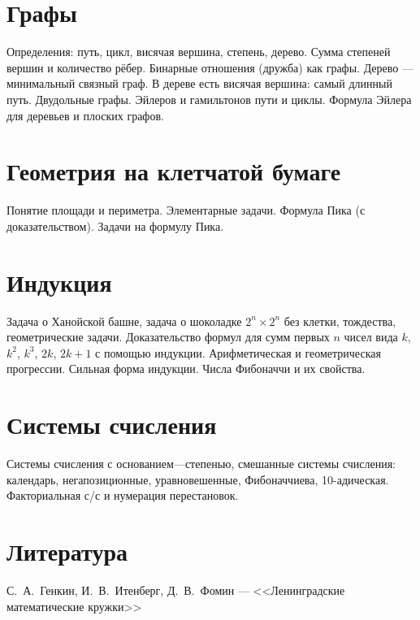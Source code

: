 \documentclass[a4paper,11pt,landscape]{article}
\begin{document}
\begin{paracol}{2}

\setlength{\columnsep}{0.9cm}

\setcounter{section}{11}

\section{Графы}

Определения: путь, цикл, висячая вершина, степень, дерево. Сумма степеней вершин и количество рёбер. Бинарные отношения (дружба) как графы. Дерево — минимальный связный граф. В дереве есть висячая вершина: самый длинный путь. Двудольные графы. Эйлеров и гамильтонов пути и циклы. Формула Эйлера для деревьев и плоских графов.

\section{Геометрия на клетчатой бумаге}

Понятие площади и периметра. Элементарные задачи. Формула Пика (с доказательством). Задачи на формулу Пика.

\section{Индукция}

Задача о Ханойской башне, задача о шоколадке $2^n \times 2^n$ без клетки, тождества, геометрические задачи. Доказательство формул для сумм первых $n$ чисел вида $k$, $k^2$\!, $k^3$\!, $2k$, $2k+1$ с помощью индукции. Арифметическая и геометрическая прогрессии. Сильная форма индукции. Числа Фибоначчи и их свойства.

\section{Системы счисления}

Системы счисления с основанием—степенью, смешанные системы счисления: календарь, негапозиционные, уравновешенные, Фибоначчиева, 10-адическая. Факториальная с/с и нумерация перестановок.

\switchcolumn

\section*{Литература}

С.~А.~Генкин, И.~В.~Итенберг, Д.~В.~Фомин — <<Ленинградские \linebreak математические кружки>>


\end{paracol}
\end{document}
